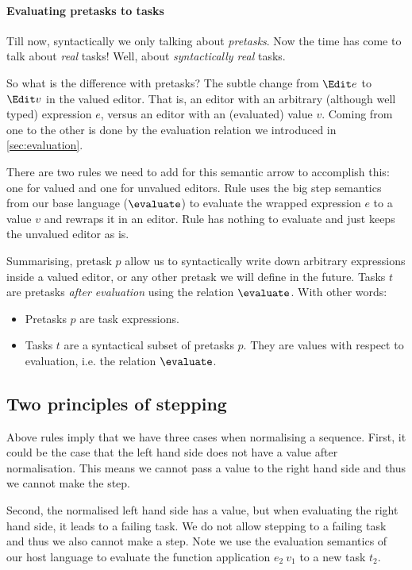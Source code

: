 \paragraph{Evaluating pretasks to tasks}
\label{sec:tasks-vs-pretasks}

Till now, syntactically we only talking about \emph{pretasks}.
Now the time has come to talk about \emph{real} tasks!
Well, about \emph{syntactically real} tasks.

So what is the difference with pretasks?
The subtle change from $\Edit e$ to $\Edit v$ in the valued editor.
That is, an editor with an arbitrary (although well typed) expression $e$,
versus an editor with an (evaluated) value $v$.
Coming from one to the other is done by the evaluation relation we introduced in \autoref{sec:evaluation}.

There are two rules we need to add for this semantic arrow to accomplish this:
one for valued and one for unvalued editors.
 
Rule  uses the big step semantics from our base language ($\evaluate$)
to evaluate the wrapped expression $e$ to a value $v$ and rewraps it in an editor.
Rule  has nothing to evaluate and just keeps the unvalued editor as is.

Summarising, pretask $p$ allow us to syntactically write down arbitrary expressions inside a valued editor,
or any other pretask we will define in the future.
Tasks $t$ are pretasks \emph{after evaluation} using the relation $\evaluate$.
With other words:
\begin{itemize}
  \item
    Pretasks $p$ are task expressions.
  \item
    Tasks $t$ are a syntactical subset of pretasks $p$.
    They are values with respect to evaluation, i.e. the relation $\evaluate$.
\end{itemize}


\subsection{Two principles of stepping}
\label{sec:normalise-sequence}

Above rules imply that we have three cases when normalising a sequence.
First,
it could be the case that the left hand side does not have a value after normalisation.
This means we cannot pass a value to the right hand side
and thus we cannot make the step.

Second,
the normalised left hand side has a value,
but when evaluating the right hand side,
it leads to a failing task.
We do not allow stepping to a failing task
and thus we also cannot make a step.
Note we use the evaluation semantics of our host language
to evaluate the function application $e_2\ v_1$ to a new task $t_2$.

